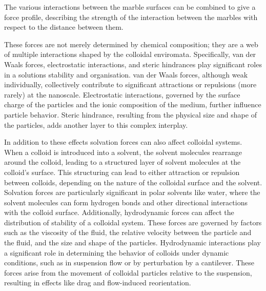 The various interactions between the marble surfaces can be combined to give a force profile, describing the strength of the interaction between the marbles with respect to the distance between them.\cite{FoundColloidBook}\cite{IsGreenBook}



These forces are not merely determined by chemical composition; they are a web of multiple interactions shaped by the colloidal enviromata. Specifically, van der Waals forces, electrostatic interactions, and steric hindrances play significant roles in a solutions stability and organisation. van der Waals forces, although weak individually, collectively contribute to significant attractions or repulsions (more rarely) at the nanoscale. Electrostatic interactions, governed by the surface charge of the particles and the ionic composition of the medium, further influence particle behavior. Steric hindrance, resulting from the physical size and shape of the particles, adds another layer to this complex interplay.

In addition to these effects solvation forces can also affect colloidal systems. When a colloid is introduced into a solvent, the solvent molecules rearrange around the colloid, leading to a structured layer of solvent molecules at the colloid's surface. This structuring can lead to either attraction or repulsion between colloids, depending on the nature of the colloidal surface and the solvent. Solvation forces are particularly significant in polar solvents like water, where the solvent molecules can form hydrogen bonds and other directional interactions with the colloid surface. Additionally, hydrodynamic forces can affect the distribution of stability of a colloidal system. These forces are governed by factors such as the viscosity of the fluid, the relative velocity between the particle and the fluid, and the size and shape of the particles. Hydrodynamic interactions play a significant role in determining the behavior of colloids under dynamic conditions, such as in suspension flow or by perturbation by a cantilever. These forces arise from the movement of colloidal particles relative to the suspension, resulting in effects like drag and flow-induced reorientation.

